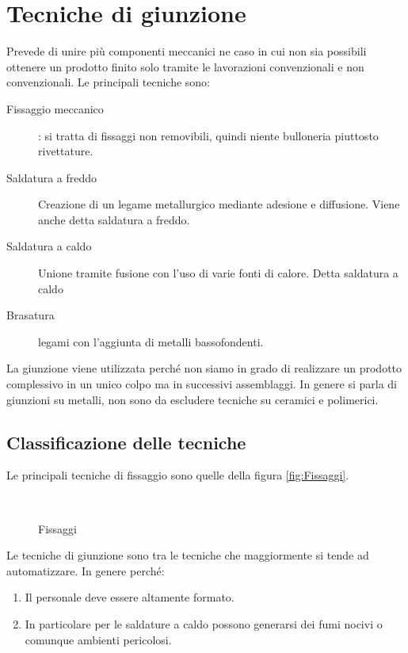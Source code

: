 \chapter{Tecniche di giunzione}\label{chp:Giunzione}
Prevede di unire più componenti meccanici ne caso in cui non sia possibili ottenere un prodotto finito solo tramite le lavorazioni convenzionali e non convenzionali.
Le principali tecniche sono:
\begin{description}
\item[Fissaggio meccanico]: si tratta di fissaggi non removibili, quindi niente bulloneria piuttosto rivettature.
\item[Saldatura a freddo] Creazione di un legame metallurgico mediante adesione e diffusione.
Viene anche detta saldatura a freddo.
\item[Saldatura a caldo] Unione tramite fusione con l'uso di varie fonti di calore. Detta saldatura a caldo
\item[Brasatura] legami con l'aggiunta di metalli bassofondenti.
\end{description}

La giunzione viene utilizzata perché non siamo in grado di realizzare un prodotto complessivo in un unico colpo ma in successivi assemblaggi.
In genere si parla di giunzioni su metalli, non sono da escludere tecniche su ceramici e polimerici.

\section{Classificazione delle tecniche}
Le principali tecniche di fissaggio sono quelle della figura \ref{fig:Fissaggi}.

\begin{figure}
\centering
{}\\
\caption{Fissaggi}
\label{fig:TipiFissagi}
\end{figure}

Le tecniche di giunzione sono tra le tecniche che maggiormente si tende ad automatizzare.
In genere perché:
\begin{enumerate}
\item Il personale deve essere altamente formato.
\item In particolare per le saldature a caldo possono generarsi dei fumi nocivi o comunque ambienti pericolosi.
\end{enumerate}


